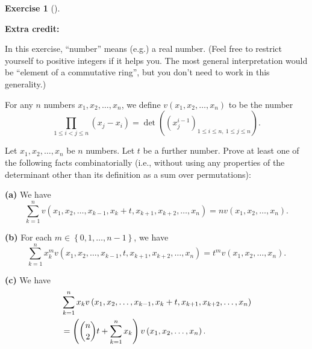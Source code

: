 \documentclass[numbers=enddot,12pt,final,onecolumn,notitlepage]{scrartcl}%
\newcounter{exer}
\theoremstyle{definition}
\newtheorem{exmp}[exer]{Exercise}
\newenvironment{exercise}[1][]
{\begin{exmp}[#1]\begin{leftbar}}
{\end{leftbar}\end{exmp}}
\let\sumnonlimits\sum
\let\prodnonlimits\prod
\renewcommand{\sum}{\sumnonlimits\limits}
\renewcommand{\prod}{\prodnonlimits\limits}
\newcommand{\tup}[1]{\left( #1 \right)}
\begin{document}
\begin{exercise}
\textbf{Extra credit:}

In this exercise, ``number'' means (e.g.) a real number. (Feel
free to restrict yourself to positive integers  if it helps you.
The most general interpretation would be ``element of a commutative
ring'', but you don't need to work in this generality.)

For any $n$ numbers $x_1, x_2, \ldots, x_n$, we define
$v\left(x_1, x_2, \ldots, x_n\right)$ to be the number
\[
 \prod_{1\leq i<j\leq n} \left( x_j - x_i \right)
 =
 \det \tup{ \tup{ x_j^{i-1} }_{1\leq i\leq n, \  1\leq j\leq n } } .
\]

Let $x_1, x_2, \ldots, x_n$ be $n$ numbers. Let $t$
be a further number.
Prove
at least one of the following facts combinatorially
(i.e., without using any properties of the determinant
other than its definition as a sum over permutations):

\textbf{(a)} We have
\[
\sum_{k=1}^{n} v\left(  x_{1},x_{2},\ldots,x_{k-1},x_{k}+t,x_{k+1}%
,x_{k+2},\ldots,x_{n}\right)
= n v\left(  x_{1},x_{2},\ldots,x_{n}\right)  .
\]

\textbf{(b)} For each $m\in\left\{ 0,1,\ldots,n-1\right\}  $, we have
\[
\sum_{k=1}^{n}x_{k}^{m}v\left(  x_{1},x_{2},\ldots,x_{k-1},t,x_{k+1}%
,x_{k+2},\ldots,x_{n}\right)
= t^{m}v\left(  x_{1},x_{2},\ldots,x_{n}\right)
.
\]

\textbf{(c)} We have
\begin{align*}
&  \sum_{k=1}^{n}x_{k}v\left(  x_{1},x_{2},\ldots,x_{k-1},x_{k}+t,x_{k+1}%
,x_{k+2},\ldots,x_{n}\right) \\
&  =\left(  \dbinom{n}{2}t+\sum_{k=1}^{n}x_{k}\right)  v\left(  x_{1}%
,x_{2},\ldots,x_{n}\right)  .
\end{align*}

\end{exercise}
\end{document}
